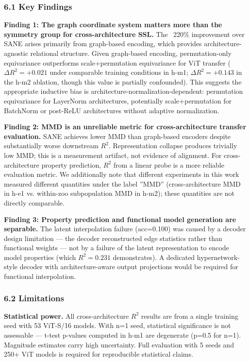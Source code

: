 
\subsubsection{6.1 Key Findings}

\textbf{Finding 1: The graph coordinate system matters more than the symmetry group for cross-architecture SSL.} The ~220\% improvement over SANE arises primarily from graph-based encoding, which provides architecture-agnostic relational structure. Given graph-based encoding, permutation-only equivariance outperforms scale+permutation equivariance for ViT transfer ($\Delta R^{2}=+0.021$ under comparable training conditions in h-m1; $\Delta R^{2}=+0.143$ in the h-m2 ablation, though this value is partially confounded). This suggests the appropriate inductive bias is architecture-normalization-dependent: permutation equivariance for LayerNorm architectures, potentially scale+permutation for BatchNorm or post-ReLU architectures without adaptive normalization.

\textbf{Finding 2: MMD is an unreliable metric for cross-architecture transfer evaluation.} SANE achieves lower MMD than graph-based encoders despite substantially worse downstream $R^2$. Representation collapse produces trivially low MMD; this is a measurement artifact, not evidence of alignment. For cross-architecture property prediction, $R^2$ from a linear probe is a more reliable evaluation metric. We additionally note that different experiments in this work measured different quantities under the label ''MMD'' (cross-architecture MMD in h-e1 vs. within-zoo subpopulation MMD in h-m2); these quantities are not directly comparable.

\textbf{Finding 3: Property prediction and functional model generation are separable.} The latent interpolation failure (acc=0.100) was caused by a decoder design limitation --- the decoder reconstructed edge statistics rather than functional weights --- not by a failure of the latent representation to encode model properties (which $R^{2}=0.231$ demonstrates). A dedicated hypernetwork-style decoder with architecture-aware output projections would be required for functional interpolation.

\subsubsection{6.2 Limitations}

\textbf{Statistical power.} All cross-architecture $R^2$ results are from a single training seed with 53 ViT-S/16 models. With n=1 seed, statistical significance is not assessable --- t-test p-values computed in h-m1 are degenerate (p=0.5 for n=1). Magnitude estimates carry high uncertainty. Full evaluation with 5 seeds and 250+ ViT models is required for reproducible statistical claims.

